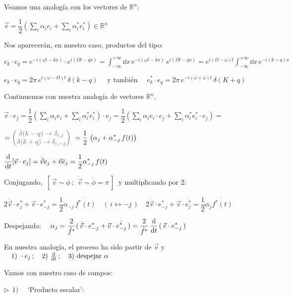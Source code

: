 Veamos una analogía con los vectores de $\mathbb R^n$:

$\displaystyle \vec v=\dfrac 1 2 \left( \sum_i \alpha_i e_i + \sum_i \alpha_i^* e_i^* \right) \in \mathbb R^n$

Nos aparecerán, en nuestro caso, productos del tipo:

$e_k\cdot e_q= e^{-i(\omega t-kx)} \cdot e^{i(\Omega t-qx)}=\displaystyle \int_{-\infty}^{+\infty} \dd x \, e^{-i(\omega t-kx)} \, e^{i(\Omega t-qx)} =  e^{i(\Omega-\omega)t} \int_{-\infty}^{+\infty} \dd x \, e^{-i(k-q)x}$

$e_k \cdot e_q= 2\pi \, e^{i(\omega-\Omega)t} \, \delta(k-q)\quad $ y también $\quad e^*_k\cdot e_q=2\pi\, e^{-i(\omega+\omega)t} \, \delta(K+q)$

Continuemos con nuestra analogía de vectores $\mathbb R^n$,

$\vec v \cdot e_j = \displaystyle \dfrac 1 2 \left( \sum_i \alpha_i e_i + \sum_i \alpha_i^* e_i^* \right) \cdot e_j= \dfrac 1 2 \left( \sum_i \alpha_i e_i \cdot e_j + \sum_i \alpha_i^* e_i^*\cdot e_j \right)= \ $ 

$\displaystyle =\textcolor{gris}{\mqty(\delta(k-q) \to \delta_{i,j} \\ \delta(k+q) \to \delta_{i,-j})} \ =
\dfrac 1 2 \, \left( \alpha_j +\alpha_{-j}^* \, f(t) \right) $

$\displaystyle \dv{t} [\vec v \cdot e_j]=\dot{\vec v} e_j + \vec v \dot e_j=\dfrac 1 2 \alpha_{-j}^* \, f(t)$

Conjugando, $\ [\, \vec v \sim \phi\, ; \ \ \dot{\vec v} \sim \dot \phi = \pi  \, ]\ $ y multiplicando por $2$:

$2 \dot{\vec v} \cdot {e_j^*} + \vec v \cdot e_{-j}^* = \dfrac 1 2 \alpha_{-j} \, \dot {f^*(t)} \quad (\, i \leftrightarrow -j \, ) \quad 2 \dot{\vec v} \cdot {e^*_{-j}} + \vec v \cdot \dot {e^*_j} = \dfrac 1 2 \alpha_j \dot {f^*(t)}$

Despejando: $\quad \displaystyle  \alpha_j = \dfrac{2}{\dot f^*} (\, \dot{\vec v} \cdot {e_{-j}^*} + \vec v\cdot \dot{e_{-j}^*} \, ) = \dfrac{2}{\dot f^*} \, \dv{t} \, (\, \vec v \cdot e^*_{-j} \, )$ 

En nuestra analogía, el proceso ha sido partir de $\vec v $ y $\quad 1) \ \cdot e_j\, ; \quad 2)\ \dv{t} \, ; \quad 3) \ \text{despejar } \alpha$


\vspace{5mm} Vamos con nuestro caso de campos:

\vspace{5mm} $\triangleright \ \ 1) \quad $ `Producto escalar':


